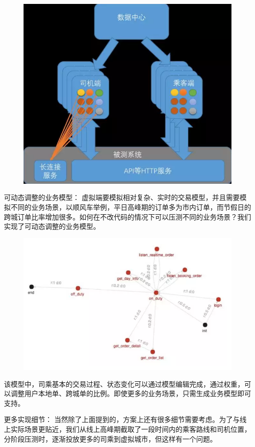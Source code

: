 \documentclass[12pt]{article}
\begin{document}
\begin{figure}[H]
    \centering
    \includegraphics[width=.6\textwidth]{fig/DIDI_Pressure_7.png}
\end{figure}

可动态调整的业务模型： 虚拟端要模拟相对复杂、实时的交易模型，并且需要模拟不同的业务场景，以顺风车举例，平日高峰期的订单多为市内订单，而节假日的跨城订单比率增加很多。如何在不改代码的情况下可以压测不同的业务场景？我们实现了可动态调整的业务模型。
\begin{figure}[H]
    \centering
    \includegraphics[width=1\textwidth]{fig/DIDI_Pressure_8.png}
\end{figure}

该模型中，司乘基本的交易过程、状态变化可以通过模型编辑完成，通过权重，可以调整用户本地单、跨城单的比例。即使更多的业务场景，只需生成业务模型即可支持。

更多实现细节： 当然除了上面提到的，方案上还有很多细节需要考虑。为了与线上实际场景更贴近，我们从线上高峰期截取了一段时间内的乘客路线和司机位置，分阶段压测时，逐渐投放更多的司乘到虚拟城市，但这样有一个问题。
\end{document}
